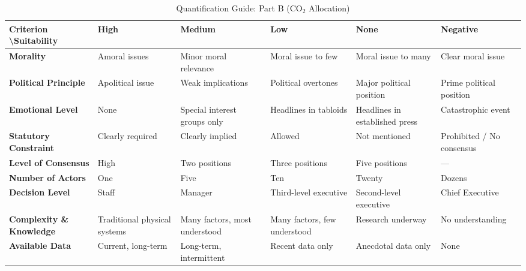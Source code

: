 \documentclass[journal, onecolumn, 12pt]{IEEEtran}
\begin{document}
\begin{table}[h]
    \caption{Quantification Guide: Part B (CO$_2$ Allocation)}
    \label{tab:guide_part_b}
    \centering
    \begin{tabular}{@{}p{2.5cm}p{2.5cm}p{2.5cm}p{2.5cm}p{2.5cm}p{2.5cm}@{}}
    \toprule
    \textbf{Criterion \textbackslash Suitability} & \textbf{High} & \textbf{Medium} & \textbf{Low} & \textbf{None} & \textbf{Negative} \\ \midrule
    
    \textbf{Morality} & Amoral issues & \cellcolor{mygreen} Minor moral relevance & Moral issue to few & Moral issue to many & Clear moral issue \\ \addlinespace
    
    \textbf{Political Principle} & Apolitical issue & Weak implications & \cellcolor{myyellow} Political overtones & Major political position & Prime political position \\ \addlinespace
    
    \textbf{Emotional Level} & None & \cellcolor{mygreen} Special interest groups only & Headlines in tabloids & Headlines in established press & Catastrophic event \\ \addlinespace
    
    \textbf{Statutory Constraint} & \cellcolor{mygreen} Clearly required & Clearly implied & Allowed & Not mentioned & Prohibited / No consensus \\ \addlinespace
    
    \textbf{Level of Consensus} & High & Two positions & \cellcolor{myyellow} Three positions & Five positions & --- \\ \addlinespace
    
    \textbf{Number of Actors} & One & Five & \cellcolor{myyellow} Ten & Twenty & Dozens \\ \addlinespace
    
    \textbf{Decision Level} & Staff & Manager & \cellcolor{myyellow} Third-level executive & Second-level executive & Chief Executive \\ \addlinespace
    
    \textbf{Complexity \& Knowledge} & \cellcolor{mygreen} Traditional physical systems & Many factors, most understood & Many factors, few understood & Research underway & No understanding \\ \addlinespace
    
    \textbf{Available Data} & \cellcolor{mygreen} Current, long-term & Long-term, intermittent & Recent data only & Anecdotal data only & None \\ \bottomrule
    \end{tabular}
\end{table}
\end{document}
